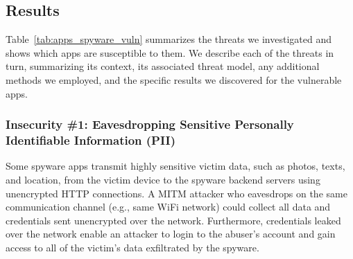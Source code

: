 \subsection{Results}

Table~\ref{tab:apps_spyware_vuln} summarizes the threats we
investigated and shows which apps are susceptible to them.
%
We describe each of the threats in turn, summarizing its context, its
associated threat model, any additional methods we employed, and the
specific results we discovered for the vulnerable apps.




\subsubsection*{Insecurity \#1: Eavesdropping Sensitive Personally Identifiable Information (PII)}

Some spyware apps transmit highly sensitive victim data, such as photos,
texts, and location, from the victim device to the spyware backend
servers using unencrypted HTTP connections.  A MITM attacker who
eavesdrops on the same communication channel (e.g., same WiFi network)
could collect all data and credentials sent unencrypted
over the network.  Furthermore, credentials leaked over the network enable
an attacker to login to the abuser's account and gain access to all of
the victim's data exfiltrated by the spyware.

